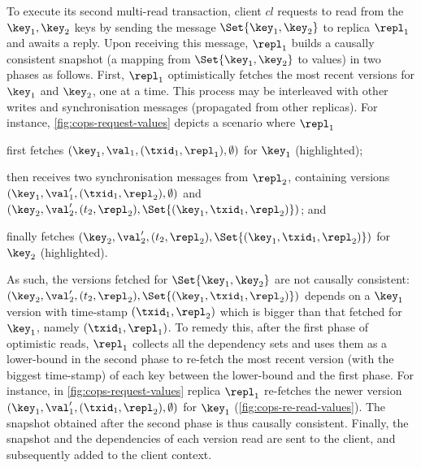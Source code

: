 To execute its second multi-read transaction,
client  \( cl \) requests to read from the $\key_1, \key_2$ keys by sending the message 
\( \Set{\key_1, \key_2} \) to replica $\repl_1$ and awaits a reply.
Upon receiving this message, $\repl_1$ builds a causally consistent snapshot (a mapping from $\Set{\key_1, \key_2}$ to values) in two phases as follows. 
First, $\repl_1$ optimistically fetches the most recent versions for $\key_1$ and $\key_2$,
one at a time. 
This process may be interleaved with other writes and synchronisation messages (propagated from other replicas). 
For instance, \cref{fig:cops-request-values} depicts a scenario where \( \repl_1 \)
\begin{enumerate*}
	\item first fetches \( (\key_1,\val_1,(\txid_1,\repl_1), \emptyset) \) for $\key_1$ (highlighted); %
	\item then receives two synchronisation messages from \( \repl_2 \), 
containing versions \( ( \key_1, \val'_1, (\txid_1,\repl_2),\emptyset ) \) and \( ( \key_2, \val'_2, (t_2,\repl_2),\Set{(\key_1,\txid_1,\repl_2)} ) \); and
	\item finally fetches \( ( \key_2, \val'_2, (t_2,\repl_2),\Set{(\key_1,\txid_1,\repl_2)} ) \) for $\key_2$ (highlighted).
\end{enumerate*}
As such, the versions fetched for \( \Set{\key_1,\key_2}\) are not causally consistent: 
\( ( \key_2, \val'_2, (t_2,\repl_2),\Set{(\key_1,\txid_1,\repl_2)} ) \) depends on a $\key_1$ version with time-stamp $(\txid_1, \repl_2)$ which is bigger than that fetched for $\key_1$, namely $(\txid_1, \repl_1)$.
To remedy this, after the first phase of optimistic reads,
$\repl_1$ collects all the dependency sets and uses them as a lower-bound in the second phase
to re-fetch the most recent version (with the biggest time-stamp) of each key between the lower-bound and the first phase.
For instance, in \cref{fig:cops-request-values} replica $\repl_1$ re-fetches the newer version \( ( \key_1, \val'_1, (\txid_1,\repl_2),\emptyset ) \) for \( \key_1 \) (\cref{fig:cops-re-read-values}).
The snapshot obtained after the second phase is thus causally consistent. 
Finally, the snapshot and the dependencies of each version read are sent to the client, and subsequently added to the client context.



